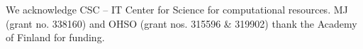 \documentclass[journal=jctcce]{achemso}
\begin{document}
\begin{acknowledgement}
We acknowledge CSC -- IT Center for Science for computational resources.
%
%
MJ (grant no. 338160) and OHSO (grant nos. 315596 \& 319902) thank the Academy of Finland for funding.

\end{acknowledgement}


\end{document}
